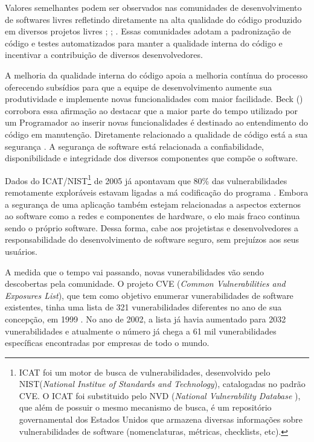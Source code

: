 Valores semelhantes podem ser observados nas comunidades de desenvolvimento de softwares livres refletindo diretamente na alta qualidade do código produzido em diversos projetos livres \cite{schmidt2001}; \cite{halloran2002}; \cite{michlmayr2003}.
%
Essas comunidades adotam a padronização de código e testes automatizados para manter a qualidade interna do código e incentivar a contribuição de diversos desenvolvedores.

A melhoria da qualidade interna do código apoia a melhoria contínua do processo oferecendo subsídios para que a equipe de desenvolvimento aumente sua produtividade e implemente novas funcionalidades com maior facilidade. Beck (\citeyear{beck2007}) corrobora essa afirmação ao destacar que a maior parte do tempo utilizado por um Programador ao inserir novas funcionalidades é destinado ao entendimento do código em manutenção. 
%
Diretamente relacionado a qualidade de código está a sua segurança \cite{tsipenyuk2005}. A segurança de software está relacionada a confiabilidade, disponibilidade e integridade dos diversos componentes que compõe o software.

Dados do ICAT/NIST\footnote{ ICAT foi um motor de busca de vulnerabilidades, desenvolvido pelo NIST(\emph{National Institue of Standards and Technology}), catalogadas no padrão CVE. O ICAT foi substituido pelo NVD (\emph{National Vulnerability Database }), que além de possuir o mesmo mecanismo de busca, é um repositório governamental dos Estados Unidos que armazena diversas informações sobre vulnerabilidades de software (nomenclaturas, métricas, checklists, etc).} de 2005 já apontavam que 80\% das vulnerabilidades remotamente exploráveis estavam ligadas a má codificação do programa \cite{duarte2005}.
%
Embora a segurança de uma aplicação também estejam relacionadas a aspectos externos ao software como a redes e componentes de hardware, o elo mais fraco continua sendo o próprio software. Dessa forma, cabe aos projetistas e desenvolvedores a responsabilidade do desenvolvimento de software seguro, sem prejuízos aos seus usuários.

%

A medida que o tempo vai passando, novas vunerabilidades vão sendo descobertas pela comunidade. O projeto CVE (\emph{Common Vulnerabilities and Exposures List}), que tem como objetivo enumerar vunerabilidades de software existentes, tinha uma lista de 321 vunerabilidades diferentes no ano de sua concepção, em 1999 \cite{cve2002}.
%
No ano de 2002, a lista já havia aumentado para 2032 vunerabilidades e atualmente o número já chega a 61 mil vunerabilidades específicas encontradas por empresas de todo o mundo.


